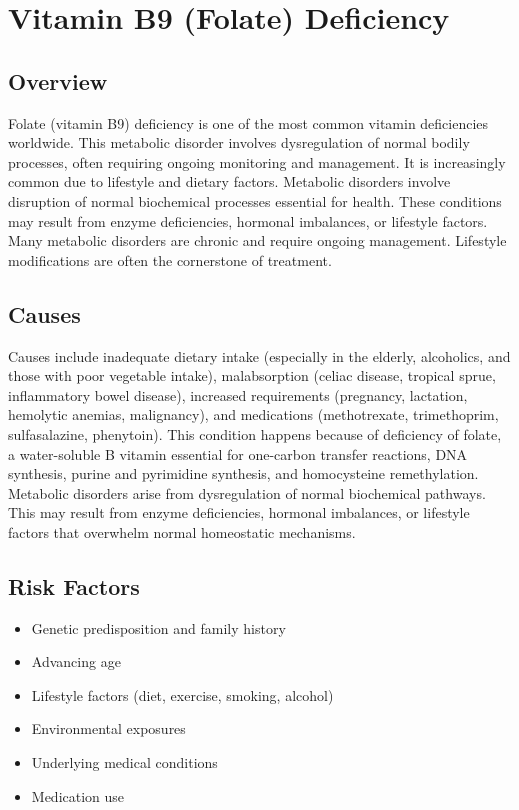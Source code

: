 \chapter{Vitamin B9 (Folate) Deficiency}
\label{sec:Vitamin B9 Deficiency}

\section{Overview}
Folate (vitamin B9) deficiency is one of the most common vitamin deficiencies worldwide. This metabolic disorder involves dysregulation of normal bodily processes, often requiring ongoing monitoring and management. It is increasingly common due to lifestyle and dietary factors. Metabolic disorders involve disruption of normal biochemical processes essential for health. These conditions may result from enzyme deficiencies, hormonal imbalances, or lifestyle factors. Many metabolic disorders are chronic and require ongoing management. Lifestyle modifications are often the cornerstone of treatment.
\section{Causes}
Causes include inadequate dietary intake (especially in the elderly, alcoholics, and those with poor vegetable intake), malabsorption (celiac disease, tropical sprue, inflammatory bowel disease), increased requirements (pregnancy, lactation, hemolytic anemias, malignancy), and medications (methotrexate, trimethoprim, sulfasalazine, phenytoin). This condition happens because of deficiency of folate, a water-soluble B vitamin essential for one-carbon transfer reactions, DNA synthesis, purine and pyrimidine synthesis, and homocysteine remethylation. Metabolic disorders arise from dysregulation of normal biochemical pathways. This may result from enzyme deficiencies, hormonal imbalances, or lifestyle factors that overwhelm normal homeostatic mechanisms.   
\section{Risk Factors}
\begin{itemize}[noitemsep]
  \item Genetic predisposition and family history
  \item Advancing age
  \item Lifestyle factors (diet, exercise, smoking, alcohol)
  \item Environmental exposures
  \item Underlying medical conditions
  \item Medication use
\end{itemize}
